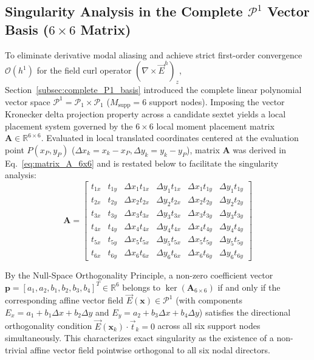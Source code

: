 \documentclass[preprint,12pt]{elsarticle}
\begin{document}
\subsection{Singularity Analysis in the Complete \texorpdfstring{$\mathcal{P}^1$}{P1} Vector Basis (\texorpdfstring{$6 \times 6$}{6x6} Matrix)}
\label{subsec:singularities_P1}

To eliminate derivative modal aliasing and achieve strict first-order convergence $\mathcal{O}(h^1)$ for the field curl operator $(\nabla \times \vec{E}^h)_z$, Section~\ref{subsec:complete_P1_basis} introduced the complete linear polynomial vector space $\mathcal{P}^1 = \mathcal{P}_1 \times \mathcal{P}_1$ ($M_{\mathrm{supp}} = 6$ support nodes). Imposing the vector Kronecker delta projection property across a candidate sextet yields a local placement system governed by the $6 \times 6$ local moment placement matrix $\mathbf{A} \in \mathbb{R}^{6 \times 6}$. Evaluated in local translated coordinates centered at the evaluation point $P(x_P, y_P)$ ($\Delta x_k = x_k - x_P, \Delta y_k = y_k - y_P$), matrix $\mathbf{A}$ was derived in Eq.~\eqref{eq:matrix_A_6x6} and is restated below to facilitate the singularity analysis:
\begin{equation}
\mathbf{A} = \begin{bmatrix}
t_{1x} & t_{1y} & \Delta x_1 t_{1x} & \Delta y_1 t_{1x} & \Delta x_1 t_{1y} & \Delta y_1 t_{1y} \\[4pt]
t_{2x} & t_{2y} & \Delta x_2 t_{2x} & \Delta y_2 t_{2x} & \Delta x_2 t_{2y} & \Delta y_2 t_{2y} \\[4pt]
t_{3x} & t_{3y} & \Delta x_3 t_{3x} & \Delta y_3 t_{3x} & \Delta x_3 t_{3y} & \Delta y_3 t_{3y} \\[4pt]
t_{4x} & t_{4y} & \Delta x_4 t_{4x} & \Delta y_4 t_{4x} & \Delta x_4 t_{4y} & \Delta y_4 t_{4y} \\[4pt]
t_{5x} & t_{5y} & \Delta x_5 t_{5x} & \Delta y_5 t_{5x} & \Delta x_5 t_{5y} & \Delta y_5 t_{5y} \\[4pt]
t_{6x} & t_{6y} & \Delta x_6 t_{6x} & \Delta y_6 t_{6x} & \Delta x_6 t_{6y} & \Delta y_6 t_{6y}
\end{bmatrix}
\label{eq:matrix_A_P1_repeated}
\end{equation}

By the Null-Space Orthogonality Principle, a non-zero coefficient vector $\mathbf{p} = [a_1, a_2, b_1, b_2, b_3, b_4]^T \in \mathbb{R}^6$ belongs to $\ker(\mathbf{A}_{6 \times 6})$ if and only if the corresponding affine vector field $\vec{E}(\mathbf{x}) \in \mathcal{P}^1$ (with components $E_x = a_1 + b_1 \Delta x + b_2 \Delta y$ and $E_y = a_2 + b_3 \Delta x + b_4 \Delta y$) satisfies the directional orthogonality condition $\vec{E}(\mathbf{x}_k) \cdot \vec{t}_k = 0$ across all six support nodes simultaneously. This characterizes exact singularity as the existence of a non-trivial affine vector field pointwise orthogonal to all six nodal directors.
\end{document}
